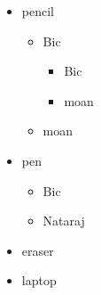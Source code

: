 \documentclass{article}
\begin{document}
	\begin{itemize}
		\item pencil
		\begin{itemize}
			\item Bic
			\begin{itemize}
				\item Bic
				\item moan
			\end{itemize}
			\item moan
		\end{itemize}
		\item pen
		\begin{itemize}
			\item Bic
			\item Nataraj
		\end{itemize}
		\item eraser
		\item laptop
	\end{itemize}
	
	
\end{document}

